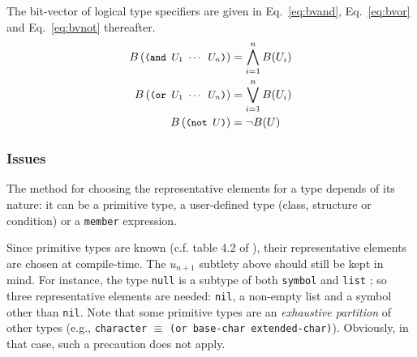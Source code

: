 \documentclass[format=sigconf]{acmart}
\newcommand\code[2][\small]{\sloppy\texttt{#1#2}}
\newcommand\mcode[2][\small]{\text{\code[#1]{#2}}}
\theoremstyle{definition}
\begin{document}
The bit-vector of logical type specifiers are given in Eq.~\ref{eq:bvand},
Eq.~\ref{eq:bvor} and Eq.~\ref{eq:bvnot} thereafter.
\begin{align}
  B\left(\mcode{(and $U_1$ $\cdots$ $U_n$)}\right) &= \bigwedge_{i=1}^n B(U_i) \label{eq:bvand}\\
  B\left(\mcode{(or $U_1$ $\cdots$ $U_n$)}\right) &= \bigvee_{i=1}^n B(U_i) \label{eq:bvor}\\
  B\left(\mcode{(not $U$)}\right) &= \neg B(U) \label{eq:bvnot}
\end{align}

\subsubsection{Issues}
\label{sec:issues}
The method for choosing the representative elements for a type depends of its
nature: it can be a primitive type, a user-defined type (class, structure or
condition) or a \code{member} expression.

Since primitive types are known (c.f. table 4.2 of
\cite{bib:ansi.94.cl.type-specifiers}), their representative elements are chosen
at compile-time.
The $u_{n+1}$ subtlety above should still be kept in mind. For
instance, the type \code{null} is a subtype of both \code{symbol} and
\code{list} ; so three representative elements are needed: \code{nil}, a non-empty
list and a symbol other than \code{nil}. Note that some primitive types are an
\emph{exhaustive partition} of other types (e.g., \code{character} $\equiv$
\code{(or base-char extended-char)}).
Obviously, in that case, such a precaution does not apply.
\end{document}
